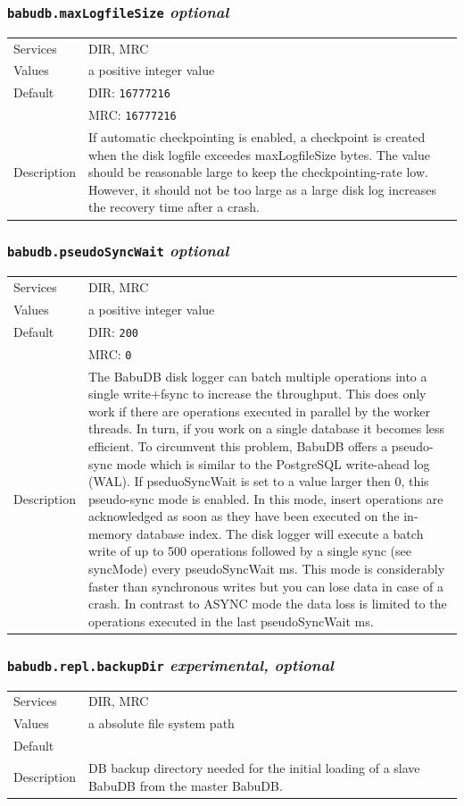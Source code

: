 \documentclass[a4paper,10pt]{book}
\begin{document}
\subsubsection{\texttt{babudb.maxLogfileSize} \textit{optional}}
\begin{tabular}{lp{10cm}}
 Services & DIR, MRC\\
 Values   & a positive integer value\\
 Default  & DIR: \texttt{16777216}\\
          & MRC: \texttt{16777216}\\
 Description & If automatic checkpointing is enabled, a checkpoint is created when the disk logfile exceedes maxLogfileSize bytes. The value should be reasonable large to keep the checkpointing-rate low. However, it should not be too large as a large disk log increases the recovery time after a crash.
\end{tabular}

\subsubsection{\texttt{babudb.pseudoSyncWait} \textit{optional}}
\begin{tabular}{lp{10cm}}
 Services & DIR, MRC\\
 Values   & a positive integer value\\
 Default  & DIR: \texttt{200}\\
          & MRC: \texttt{0}\\
 Description & The BabuDB disk logger can batch multiple operations into a single write+fsync to increase the throughput. This does only work if there are operations executed in parallel by the worker threads. In turn, if you work on a single database it becomes less efficient. To circumvent this problem, BabuDB offers a pseudo-sync mode which is similar to the PostgreSQL write-ahead log (WAL). If pseduoSyncWait is set to a value larger then 0, this pseudo-sync mode is enabled. In this mode, insert operations are acknowledged as soon as they have been executed on the in-memory database index. The disk logger will execute a batch write of up to 500 operations followed by a single sync (see syncMode) every pseudoSyncWait ms. This mode is considerably faster than synchronous writes but you can lose data in case of a crash. In contrast to ASYNC mode the data loss is limited to the operations executed in the last pseudoSyncWait ms.
\end{tabular}

\subsubsection{\texttt{babudb.repl.backupDir} \textit{experimental, optional}}
\begin{tabular}{lp{10cm}}
 Services & DIR, MRC\\
 Values   & a absolute file system path\\
 Default  & \\
 Description & DB backup directory needed for the initial loading of a slave BabuDB from the master BabuDB.
\end{tabular}
\end{document}
